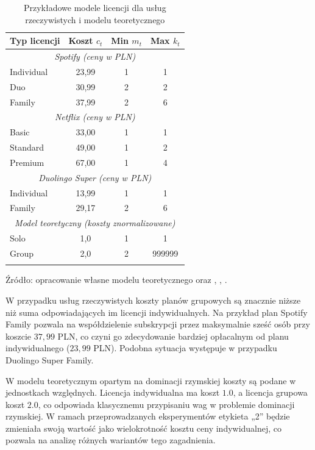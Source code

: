 \begin{table}[h!]
\centering
\caption{Przykładowe modele licencji dla usług rzeczywistych i modelu teoretycznego}
\begin{tabular}{lccc}
\hline
\textbf{Typ licencji} & \textbf{Koszt $c_t$} & \textbf{Min $m_t$} & \textbf{Max $k_t$} \\
\hline
\multicolumn{4}{c}{\textit{Spotify (ceny w PLN)}} \\
Individual & 23,99 & 1 & 1 \\
Duo        & 30,99 & 2 & 2 \\
Family     & 37,99 & 2 & 6 \\
\hline
\multicolumn{4}{c}{\textit{Netflix (ceny w PLN)}} \\
Basic       & 33,00 & 1 & 1 \\
Standard    & 49,00 & 1 & 2 \\
Premium     & 67,00 & 1 & 4 \\
\hline
\multicolumn{4}{c}{\textit{Duolingo Super (ceny w PLN)}} \\
Individual & 13,99 & 1 & 1 \\
Family     & 29,17 & 2 & 6 \\
\hline
\multicolumn{4}{c}{\textit{Model teoretyczny (koszty znormalizowane)}} \\
Solo       & 1,0   & 1 & 1 \\
Group      & 2,0   & 2 & 999999 \\
\hline
\label{tab:license_models_real}
\end{tabular}

Źródło: opracowanie własne modelu teoretycznego oraz \cite{spotify_price2024}, \cite{spotify_price2025}, \cite{duolingo_app2024}.

\end{table}


W przypadku usług rzeczywistych koszty planów grupowych są znacznie niższe niż suma odpowiadających im licencji indywidualnych. Na przykład plan Spotify Family pozwala na współdzielenie subskrypcji przez maksymalnie sześć osób przy koszcie $37{,}99$ PLN, co czyni go zdecydowanie bardziej opłacalnym od planu indywidualnego ($23{,}99$ PLN). Podobna sytuacja występuje w przypadku Duolingo Super Family.

W modelu teoretycznym opartym na dominacji rzymskiej koszty są podane w jednostkach względnych. Licencja indywidualna ma koszt $1.0$, a licencja grupowa koszt $2.0$, co odpowiada klasycznemu przypisaniu wag w problemie dominacji rzymskiej. W ramach przeprowadzanych eksperymentów etykieta „2” będzie zmieniała swoją wartość jako wielokrotność kosztu ceny indywidualnej, co pozwala na analizę różnych wariantów tego zagadnienia.


